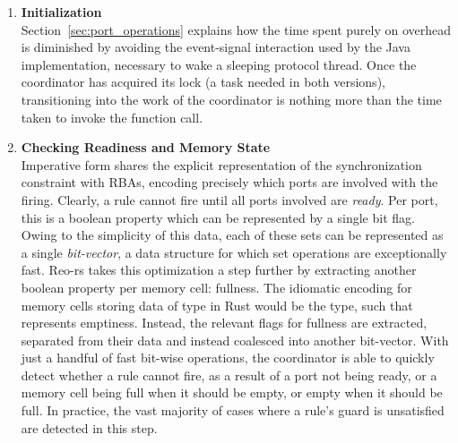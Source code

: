 \begin{enumerate}
	\item \textbf{Initialization}\\
	Section~\ref{sec:port_operations} explains how the time spent purely on overhead is diminished by avoiding the event-signal interaction used by the Java implementation, necessary to wake a sleeping protocol thread. Once the coordinator has acquired its lock (a task needed in both versions), transitioning into the work of the coordinator is nothing more than the time taken to invoke the  function call.
	
	\item \textbf{Checking Readiness and Memory State}\\
	Imperative form shares the explicit representation of the synchronization constraint with RBAs, encoding precisely which ports are involved with the firing. Clearly, a rule cannot fire until all ports involved are \textit{ready}. Per port, this is a boolean property which can be represented by a single bit flag. Owing to the simplicity of this data, each of these sets can be represented as a single \textit{bit-vector}, a data structure for which set operations are exceptionally fast. Reo-rs takes this optimization a step further by extracting another boolean property per memory cell: fullness. The idiomatic encoding for memory cells storing data of type  in Rust would be the  type, such that  represents emptiness. Instead, the relevant flags for fullness are extracted, separated from their data and instead coalesced into another bit-vector. With just a handful of fast bit-wise operations, the coordinator is able to quickly detect whether a rule cannot fire, as a result of a port not being ready, or a memory cell being full when it should be empty, or empty when it should be full. In practice, the vast majority of cases where a rule's guard is unsatisfied are detected in this step.
	

\end{enumerate}
